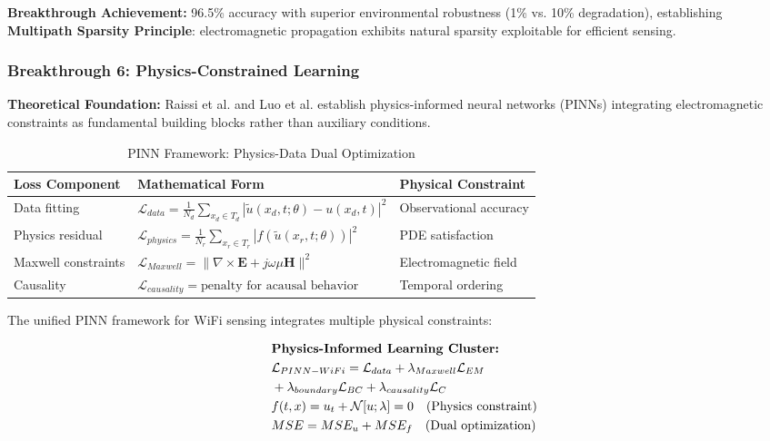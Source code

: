 \documentclass[journal]{IEEEtran}
\begin{document}
\textbf{Breakthrough Achievement:} 96.5\% accuracy with superior environmental robustness (1\% vs. 10\% degradation), establishing \textbf{Multipath Sparsity Principle}: electromagnetic propagation exhibits natural sparsity exploitable for efficient sensing.

\subsubsection{Breakthrough 6: Physics-Constrained Learning}

\textbf{Theoretical Foundation:} Raissi et al. \cite{raissi2019physics} and Luo et al. \cite{luo2025physics} establish physics-informed neural networks (PINNs) integrating electromagnetic constraints as fundamental building blocks rather than auxiliary conditions.

\begin{table}[h]
\centering
\caption{PINN Framework: Physics-Data Dual Optimization}
\label{tab:pinn_framework}
\begin{tabular}{|p{1.5cm}|p{3.5cm}|p{1.5cm}|}
\hline
\textbf{Loss Component} & \textbf{Mathematical Form} & \textbf{Physical Constraint} \\
\hline
Data fitting & $\mathcal{L}_{data} = \frac{1}{N_d}\sum_{x_d \in T_d}|\tilde{u}(x_d, t; \theta) - u(x_d, t)|^2$ & Observational accuracy \\
Physics residual & $\mathcal{L}_{physics} = \frac{1}{N_r}\sum_{x_r \in T_r}|f(\tilde{u}(x_r, t; \theta))|^2$ & PDE satisfaction \\
Maxwell constraints & $\mathcal{L}_{Maxwell} = \|\nabla \times \mathbf{E} + j\omega \mu \mathbf{H}\|^2$ & Electromagnetic field \\
Causality & $\mathcal{L}_{causality} = \text{penalty for acausal behavior}$ & Temporal ordering \\
\hline
\end{tabular}
\end{table}

The unified PINN framework for WiFi sensing integrates multiple physical constraints:

\begin{align}
&\hspace{2em} \text{\textbf{Physics-Informed Learning Cluster:}} \quad &  \nonumber \\
&\hspace{2em} \mathcal{L}_{PINN-WiFi} = \mathcal{L}_{data} + \lambda_{Maxwell} \mathcal{L}_{EM} \quad &  \nonumber \\
&\hspace{2em} + \lambda_{boundary} \mathcal{L}_{BC} + \lambda_{causality} \mathcal{L}_{C} \label{eq:pinn_wifi_v4} \\
&\hspace{2em} f(t,x) = u_t + \mathcal{N}[u; \lambda] = 0 \quad \text{(Physics constraint)} \label{eq:pde_constraint_v4} \\
&\hspace{2em} MSE = MSE_u + MSE_f \quad \text{(Dual optimization)} \label{eq:dual_optimization_v4}
\end{align}
\end{document}
